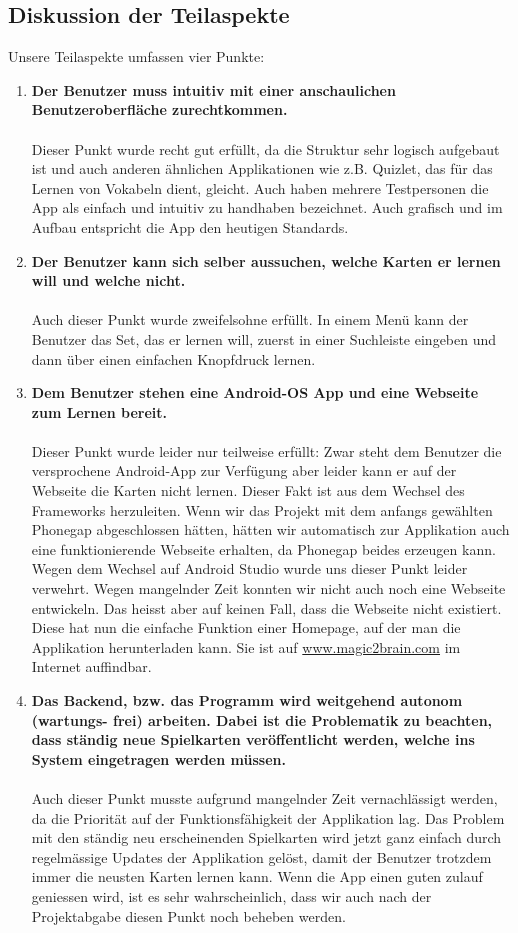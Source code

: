 \subsection{Diskussion der Teilaspekte}
Unsere Teilaspekte umfassen vier Punkte:
\begin{enumerate}
\item
\textbf{Der Benutzer muss intuitiv mit einer anschaulichen Benutzeroberfläche
zurechtkommen.}
\\
\\
Dieser Punkt wurde recht gut erfüllt, da die Struktur sehr logisch aufgebaut ist und auch anderen ähnlichen Applikationen wie z.B. Quizlet, das für das Lernen von Vokabeln dient, gleicht. Auch haben mehrere Testpersonen die App als einfach und intuitiv zu handhaben bezeichnet. Auch grafisch und im Aufbau entspricht die App den heutigen Standards.
\item
\textbf{Der Benutzer kann sich selber aussuchen, welche Karten er lernen will und
welche nicht.}
\\
\\
Auch dieser Punkt wurde zweifelsohne erfüllt. In einem Menü kann der Benutzer das Set, das er lernen will, zuerst in einer Suchleiste eingeben und dann über einen einfachen Knopfdruck lernen.
\item
\textbf{Dem Benutzer stehen eine Android-OS App und eine Webseite zum Lernen
bereit.}
\\
\\
Dieser Punkt wurde leider nur teilweise erfüllt: Zwar steht dem Benutzer die versprochene Android-App zur Verfügung aber leider kann er auf der Webseite die Karten nicht lernen. Dieser Fakt ist aus dem Wechsel des Frameworks herzuleiten. Wenn wir das Projekt mit dem anfangs gewählten Phonegap abgeschlossen hätten, hätten wir automatisch zur Applikation auch eine funktionierende Webseite erhalten, da Phonegap beides erzeugen kann. Wegen dem Wechsel auf Android Studio wurde uns dieser Punkt leider verwehrt. Wegen mangelnder Zeit konnten wir nicht auch noch eine Webseite entwickeln. Das heisst aber auf keinen Fall, dass die Webseite nicht existiert. Diese hat nun die einfache Funktion einer Homepage, auf der man die Applikation herunterladen kann. Sie ist auf \hyperlink{www.magic2brain.com}{www.magic2brain.com} im Internet auffindbar.
\item
\textbf{Das Backend, bzw. das Programm wird weitgehend autonom (wartungs-
frei) arbeiten. Dabei ist die Problematik zu beachten, dass ständig neue
Spielkarten veröffentlicht werden, welche ins System eingetragen werden
müssen.}
\\
\\
Auch dieser Punkt musste aufgrund mangelnder Zeit vernachlässigt werden, da die Priorität auf der Funktionsfähigkeit der Applikation lag. Das Problem mit den ständig neu erscheinenden Spielkarten wird jetzt ganz einfach durch regelmässige Updates der Applikation gelöst, damit der Benutzer trotzdem immer die neusten Karten lernen kann. Wenn die App einen guten zulauf geniessen wird, ist es sehr wahrscheinlich, dass wir auch nach der Projektabgabe diesen Punkt noch beheben werden.
\end{enumerate}
